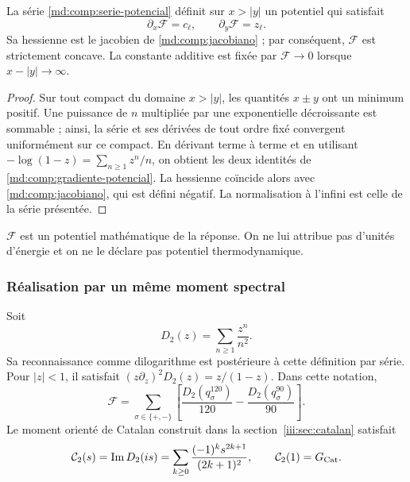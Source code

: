 \begin{proposition}
\label{md:comp:prop-potencial}
La série \eqref{md:comp:serie-potencial} définit sur \(x>|y|\) un potentiel
qui satisfait
\begin{equation}
 \boxed{\partial_x\mathscr F=c_\ell,\qquad
        \partial_y\mathscr F=z_\ell.}
 \label{md:comp:gradiente-potencial}
\end{equation}
Sa hessienne est le jacobien de
\eqref{md:comp:jacobiano} ; par conséquent, \(\mathscr F\) est
strictement concave. La constante additive est fixée par
\(\mathscr F\longrightarrow0\) lorsque \(x-|y|\longrightarrow\infty\).
\end{proposition}
\begin{proof}
Sur tout compact du domaine \(x>|y|\), les quantités \(x\pm y\)
ont un minimum positif. Une puissance de \(n\) multipliée par une
exponentielle décroissante est sommable ; ainsi, la série et ses dérivées
de tout ordre fixé convergent uniformément sur ce compact.
En dérivant terme à terme et en utilisant
\(-\log(1-z)=\sum_{n\geq1}z^n/n\), on obtient les deux identités
de \eqref{md:comp:gradiente-potencial}. La hessienne coïncide alors
avec \eqref{md:comp:jacobiano}, qui est défini négatif.
La normalisation à l’infini est celle de la série présentée.
\end{proof}

\(\mathscr F\) est un potentiel mathématique de la réponse. On ne lui
attribue pas d’unités d’énergie et on ne le déclare pas potentiel thermodynamique.

\subsubsection{Réalisation par un même moment spectral}
\label{md:comp:momento-espectral}

Soit
\[
 D_2(z)=\sum_{n\geq1}\frac{z^n}{n^2}.
\]
Sa reconnaissance comme dilogarithme est postérieure à cette définition par
série. Pour \(|z|<1\), il satisfait
\((z\partial_z)^2D_2(z)=z/(1-z)\). Dans cette notation,
\begin{equation}
 \mathscr F=
 \sum_{\sigma\in\{+,-\}}
 \left[\frac{D_2(q_\sigma^{120})}{120}
       -\frac{D_2(q_\sigma^{90})}{90}\right].
 \label{md:comp:potencial-dos-momentos}
\end{equation}
Le moment orienté de Catalan construit dans la section~\ref{iii:sec:catalan} satisfait
\begin{equation}
 \mathcal C_2(s)=\operatorname{Im}D_2(is)
 =\sum_{k\geq0}\frac{(-1)^ks^{2k+1}}{(2k+1)^2},\qquad
 \mathcal C_2(1)=G_{\rm Cat}.
 \label{md:comp:catalan-momento}
\end{equation}

